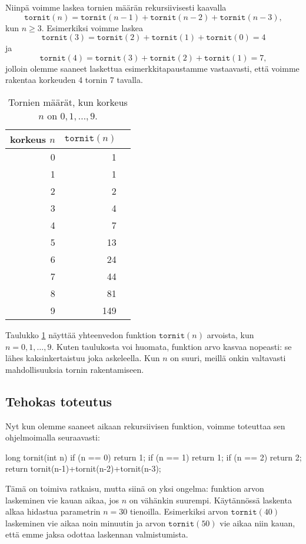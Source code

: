 Niinpä voimme laskea tornien määrän rekursiivisesti kaavalla
\[
\texttt{tornit}(n) = \texttt{tornit}(n-1)+\texttt{tornit}(n-2)+\texttt{tornit}(n-3),
\]
kun $n \ge 3$.
Esimerkiksi voimme laskea
\[
\texttt{tornit}(3) = \texttt{tornit}(2)+\texttt{tornit}(1)+\texttt{tornit}(0)=4
\]
ja
\[
\texttt{tornit}(4) = \texttt{tornit}(3)+\texttt{tornit}(2)+\texttt{tornit}(1)=7,
\]
jolloin olemme saaneet laskettua esimerkkitapaustamme vastaavasti,
että voimme rakentaa korkeuden 4 tornin 7 tavalla.

\begin{table}
\center
\begin{tabular}{rrr}
korkeus $n$ & $\texttt{tornit}(n)$ \\
\hline
0 & 1 \\
1 & 1 \\
2 & 2 \\
3 & 4 \\
4 & 7 \\
5 & 13 \\
6 & 24 \\
7 & 44 \\
8 & 81 \\
9 & 149 \\
\end{tabular}
\caption{Tornien määrät, kun korkeus $n$ on $0,1,\dots,9$.}
\label{tab:dyntor}
\end{table}

Taulukko \ref{tab:dyntor} näyttää yhteenvedon funktion
$\texttt{tornit}(n)$ arvoista, kun $n=0,1,\dots,9$.
Kuten taulukosta voi huomata, funktion arvo kasvaa nopeasti:
se lähes kaksinkertaistuu joka askeleella.
Kun $n$ on suuri,
meillä onkin valtavasti mahdollisuuksia tornin rakentamiseen.

\subsection{Tehokas toteutus}

Nyt kun olemme saaneet aikaan rekursiivisen funktion,
voimme toteuttaa sen ohjelmoimalla seuraavasti:

\begin{code}
long tornit(int n) {
    if (n == 0) return 1;
    if (n == 1) return 1;
    if (n == 2) return 2;
    return tornit(n-1)+tornit(n-2)+tornit(n-3);
}
\end{code}

Tämä on toimiva ratkaisu, mutta siinä on yksi ongelma:
funktion arvon laskeminen vie kauan aikaa, jos $n$ on
vähänkin suurempi.
Käytännössä laskenta alkaa hidastua parametrin $n=30$ tienoilla.
Esimerkiksi arvon $\texttt{tornit}(40)$ laskeminen vie aikaa
noin minuutin ja arvon $\texttt{tornit}(50)$ vie aikaa niin kauan,
että emme jaksa odottaa laskennan valmistumista.

